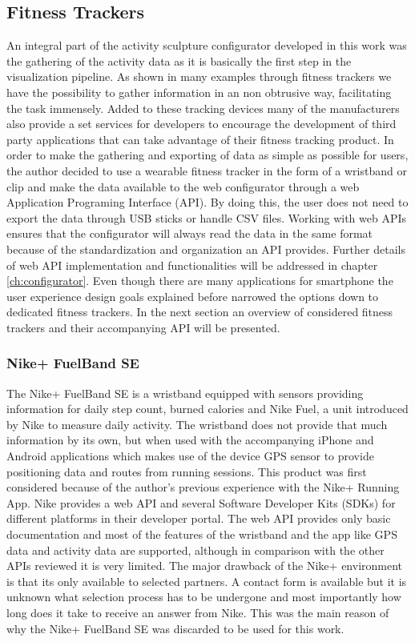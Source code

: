\documentclass[../medieninformatik-arbeit.tex]{subfiles}
\begin{document}
\subsection{Fitness Trackers}
An integral part of the activity sculpture configurator developed in this work was the gathering of the activity data as it is basically the first step in the visualization pipeline. As shown in many examples\cite{khot2014understanding,swaminathan2014supporting,mental2014fabrications} through fitness trackers we have the possibility to gather information in an non obtrusive way, facilitating the task immensely. Added to these tracking devices many of the manufacturers also provide a set services for developers to encourage the development of third party applications that can take advantage of their fitness tracking product. In order to make the gathering and exporting of data as simple as possible for users, the author decided to use a wearable fitness tracker in the form of a wristband or clip and make the data available to the web configurator through a web Application Programing Interface (API). By doing this, the user does not need to export the data through USB sticks or handle CSV files. Working with web APIs ensures that the configurator will always read the data in the same format because of the standardization and organization an API provides. Further details of web API implementation and functionalities will be addressed in chapter \ref{ch:configurator}. Even though there are many applications for smartphone the user experience design goals explained before narrowed the options down to dedicated fitness trackers. In the next section an overview of considered fitness trackers and their accompanying API will be presented.

\subsubsection*{Nike+ FuelBand SE}
The Nike+ FuelBand SE\cite{nikePlusFuelBand} is a wristband equipped with sensors providing information for daily step count, burned calories and Nike Fuel, a unit introduced by Nike to measure daily activity. The wristband does not provide that much information by its own, but when used with the accompanying iPhone and Android applications which makes use of the device GPS sensor to provide positioning data and routes from running sessions. This product was first considered because of the author's previous experience with the Nike+ Running App\cite{nikeRunningApp}. Nike provides a web API and several Software Developer Kits (SDKs) for different platforms in their developer portal\cite{nikeApi}. The web API provides only basic documentation and most of the features of the wristband and the app like GPS data and activity data are supported, although in comparison with the other APIs reviewed it is very limited. The major drawback of the Nike+ environment is that its only available to selected partners. A contact form is available but it is unknown what selection process has to be undergone and most importantly how long does it take to receive an answer from Nike. This was the main reason of why the Nike+ FuelBand SE was discarded to be used for this work.  
\end{document}

